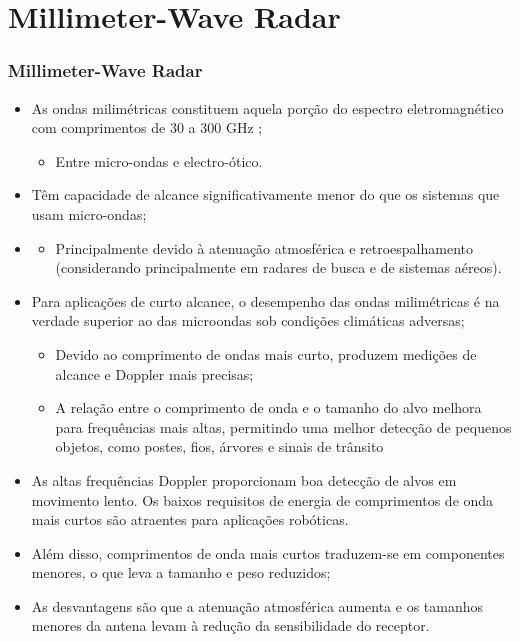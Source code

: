 \documentclass[xcolor=dvipsnames, aspectratio=169]{beamer}
\begin{document}
\section[Millimeter-Wave Radar]{Millimeter-Wave Radar} 
\begin{frame}
\frametitle{Millimeter-Wave Radar}
	\begin{itemize}
		\item As ondas milimétricas constituem aquela porção do espectro eletromagnético com comprimentos de 30 a 300 GHz \cite{everett1995sensors};
		\begin{itemize}
            \item Entre micro-ondas e electro-ótico.
        \end{itemize} 
		\item Têm capacidade de alcance significativamente menor do que os sistemas que usam micro-ondas;
		\item \begin{itemize}
            \item Principalmente devido à atenuação atmosférica e retroespalhamento (considerando principalmente em radares de busca e de sistemas aéreos).
        \end{itemize}
		\item Para aplicações de curto alcance, o desempenho das ondas milimétricas é na verdade superior ao das microondas sob condições climáticas adversas;
		\begin{itemize}
            \item Devido ao comprimento de ondas mais curto, produzem medições de alcance e Doppler mais precisas;
            \item A relação entre o comprimento de onda e o tamanho do alvo melhora para frequências mais
            altas, permitindo uma melhor detecção de pequenos objetos, como postes, fios, árvores e sinais
            de trânsito
        \end{itemize}
        \item As altas frequências Doppler proporcionam boa detecção de alvos em movimento lento. Os baixos requisitos de energia
        de comprimentos de onda mais curtos são atraentes para aplicações robóticas. 
        \item Além disso, comprimentos de onda mais curtos traduzem-se em componentes menores, o que leva a tamanho e
        peso reduzidos; 
        \item As desvantagens são que a atenuação atmosférica aumenta e os tamanhos
        menores da antena levam à redução da sensibilidade do receptor.
	\end{itemize}
\end{frame}
\end{document}
